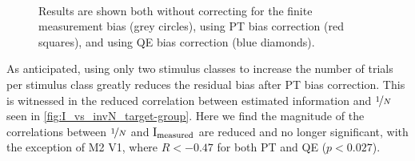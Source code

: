 \begin{figure}[htbp]
    \centering
    \hspace*{\fill}
    \hspace*{\fill}\hspace{.2cm}\hspace*{\fill}
    \hspace*{\fill}
    \\
    \hspace*{\fill}
    \hspace*{\fill}\hspace{.2cm}\hspace*{\fill}
    \hspace*{\fill}
    \caption{
Results are shown both without correcting for the finite measurement bias (grey circles), using \ac{PT} bias correction (red squares), and using \ac{QE} bias correction (blue diamonds).
}
    \label{fig:I_vs_invN_target-group}
\end{figure}


As anticipated, using only two stimulus classes to increase the number of trials per stimulus class greatly reduces the residual bias after \ac{PT} bias correction.
This is witnessed in the reduced correlation between estimated information and $\nicefrac{1}{N}$ seen in \autoref{fig:I_vs_invN_target-group}.
Here we find the magnitude of the correlations between $\nicefrac{1}{N}$ and $\operatorname{I}_\text{measured}$ are reduced and no longer significant, with the exception of \ac{M2} \ac{V1}, where $R<-0.47$ for both \ac{PT} and \ac{QE} ($p < 0.027$).


